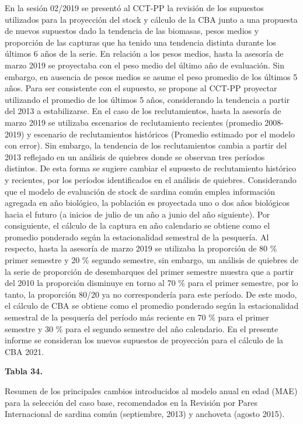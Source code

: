 \documentclass[
  spanish,
]{article}
\begin{document}
En la sesión 02/2019 se presentó al CCT-PP la revisión de los supuestos
utilizados para la proyección del stock y cálculo de la CBA junto a una
propuesta de nuevos supuestos dado la tendencia de las biomasas, pesos
medios y proporción de las capturas que ha tenido una tendencia distinta
durante los últimos 6 años de la serie. En relación a los pesos medios,
hasta la asesoría de marzo 2019 se proyectaba con el peso medio del
último año de evaluación. Sin embargo, en ausencia de pesos medios se
asume el peso promedio de los últimos 5 años. Para ser consistente con
el supuesto, se propone al CCT-PP proyectar utilizando el promedio de
los últimos 5 años, considerando la tendencia a partir del 2013 a
estabilizarse. En el caso de los reclutamientos, hasta la asesoría de
marzo 2019 se utilizaba escenarios de reclutamiento recientes (promedio
2008-2019) y escenario de reclutamientos históricos (Promedio estimado
por el modelo con error). Sin embargo, la tendencia de los
reclutamientos cambia a partir del 2013 reflejado en un análisis de
quiebres donde se observan tres períodos distintos. De esta forma se
sugiere cambiar el supuesto de reclutamiento histórico y recientes, por
los períodos identificados en el análisis de quiebres. Considerando que
el modelo de evaluación de stock de sardina común emplea información
agregada en año biológico, la población es proyectada uno o dos años
biológicos hacia el futuro (a inicios de julio de un año a junio del año
siguiente). Por consiguiente, el cálculo de la captura en año calendario
se obtiene como el promedio ponderado según la estacionalidad semestral
de la pesquería. Al respecto, hasta la asesoría de marzo 2019 se
utilizaba la proporción de 80 \% primer semestre y 20 \% segundo
semestre, sin embargo, un análisis de quiebres de la serie de proporción
de desembarques del primer semestre muestra que a partir del 2010 la
proporción disminuye en torno al 70 \% para el primer semestre, por lo
tanto, la proporción 80/20 ya no correspondería para este período. De
este modo, el cálculo de CBA se obtiene como el promedio ponderado según
la estacionalidad semestral de la pesquería del período más reciente en
70 \% para el primer semestre y 30 \% para el segundo semestre del año
calendario. En el presente informe se consideran los nuevos supuestos de
proyección para el cálculo de la CBA 2021.

\pagebreak

\small
\begin{center} 
\textbf{Tabla 34.}
\end{center}
\begin{center} 
\vspace{-0.2cm} Resumen de los principales cambios introducidos al modelo anual en edad (MAE) para la selección del caso base, recomendados en la Revisión por Pares Internacional de sardina común (septiembre, 2013) y anchoveta (agosto 2015).
\end{center}
\vspace{-0.2cm}
\end{document}
